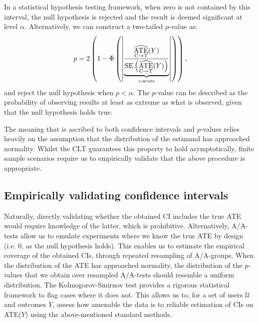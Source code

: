 In  a statistical hypothesis testing framework, when zero is not contained by this interval, the null hypothesis is rejected and the result is deemed significant at level $\alpha$.
Alternatively, we can construct a two-tailed $p$-value as:
\begin{equation}\label{eq:pvalue}
    p = 2 \left(1- \Phi\left( \left| \underbrace{\frac{\widehat{\mathop{\rm ATE}\limits_{{\rm C} \to {\rm T}}}(Y)}{\text{SE}\left(\widehat{\mathop{\rm ATE}\limits_{{\rm C} \to {\rm T}}}(Y)\right)}}_{z\text{-score}} \right| \right)\right),
\end{equation}
and reject the null hypothesis when $p < \alpha$.
The $p$-value can be described as the probability of observing results at least as extreme as what is observed, given that the null hypothesis holds true.

The meaning that is ascribed to both confidence intervals and $p$-values relies heavily on the assumption that the distribution of the estimand has approached normality. 
Whilst the CLT guarantees this property to hold asymptotically, finite sample scenarios require us to empirically validate that the above procedure is appropriate. 

\subsection{Empirically validating confidence intervals}
Naturally, directly validating whether the obtained CI includes the true ATE would require knowledge of the latter, which is prohibitive.
Alternatively, A/A-tests allow us to emulate experiments where we know the true ATE by design (i.e. $0$, as the null hypothesis holds).
This enables us to estimate the empirical coverage of the obtained CIs, through repeated resampling of A/A-groups.
When the distribution of the ATE has approached normality, the distribution of the $p$-values that we obtain over resampled A/A-tests should resemble a uniform distribution.
The Kolmogorov-Smirnov test provides a rigorous statistical framework to flag cases where it does not.
This allows us to, for a set of users $\mathcal{U}$ and outcomes $Y$, assess how amenable the data is to reliable estimation of CIs on ATE($Y$) using the above-mentioned standard methods.

